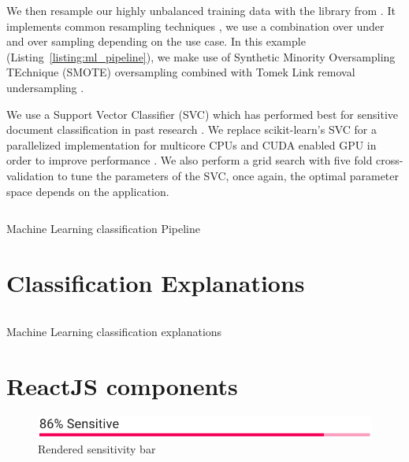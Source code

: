 \documentclass[\version]{l4proj}
\begin{document}
We then resample our highly unbalanced training data with the \textcite{ScikitlearncontribImbalancedlearn2020} library from \textcite{lemaitreImbalancedlearnPythonToolbox2017}.
It implements common resampling techniques \autocite{lemaitreImbalancedlearnPythonToolbox2017}, we use a combination over under and over sampling depending on the use case.
In this example (Listing~\ref{listing:ml_pipeline}), we make use of Synthetic Minority Oversampling TEchnique (SMOTE) oversampling combined with Tomek Link removal undersampling \autocite{batistaStudyBehaviorSeveral2004}.

We use a Support Vector Classifier (SVC) which has performed best for sensitive document classification in past research \autocite{mcdonaldClassifierDigitalSensitivity2014,mcdonaldStudySVMKernel2017}.
We replace scikit-learn's SVC for a parallelized implementation for multicore CPUs and CUDA enabled GPU in order to improve performance \autocite{wenThunderSVMFastSVM2018}.
We also perform a grid search with five fold cross-validation to tune the parameters of the SVC, once again, the optimal parameter space depends on the application.

\begin{listing}[H]
    \inputminted{python}{code/ml_pipeline.py}
    \caption{Machine Learning classification Pipeline}\label{listing:ml_pipeline}
\end{listing}

\section{Classification Explanations}

\begin{listing}[H]
    \inputminted{python}{code/explanations.py}
    \caption{Machine Learning classification explanations}\label{listing:ml_explanations}
\end{listing}

\section{ReactJS components}

\begin{figure}
    \includegraphics[width=\linewidth]{figures/sensitivity_bar.pdf}
    \caption{Rendered sensitivity bar}\label{fig:sensitivity_bar_preview}
    \vspace{-10pt}
\end{figure}
\end{document}
